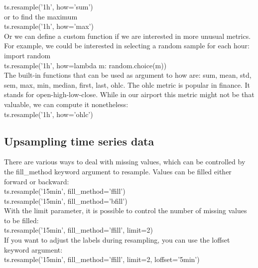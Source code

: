\documentclass{article}
\numberwithin{equation}{section} %
\begin{document}
ts.resample('1h', how='sum') \\

or to find the maximum \\

ts.resample('1h', how='max') \\

Or we can define a custom function if we are interested in more unusual metrics. For example, we could be interested in selecting a random sample for each hour: \\

import random \\

ts.resample('1h', how=lambda m: random.choice(m)) \\

The built-in functions that can be used as argument to how are: sum, mean, std, sem,
max, min, median, first, last, ohlc. The ohlc metric is popular in finance. It stands
for open-high-low-close. While in our airport this metric might not be that valuable, we can compute it nonetheless: \\

ts.resample('1h', how='ohlc') \\


\subsection*{Upsampling time series data}

There are various ways to deal with missing values, which can be controlled by the fill\_method keyword argument to resample. Values can be filled either forward or backward: \\

ts.resample('15min', fill\_method='ffill') \\

ts.resample('15min', fill\_method='bfill') \\

With the limit parameter, it is possible to control the number of missing values to be filled: \\

ts.resample('15min', fill\_method='ffill', limit=2) \\

If you want to adjust the labels during resampling, you can use the loffset keyword argument: \\

ts.resample('15min', fill\_method='ffill', limit=2, loffset='5min') \\
\end{document}
